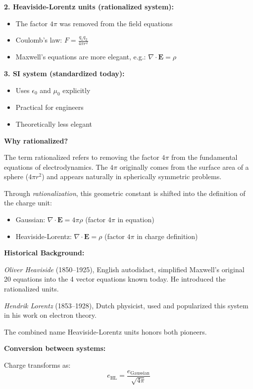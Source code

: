 \textbf{2. Heaviside-Lorentz units (rationalized system):}
\begin{itemize}[nosep]
	\item The factor $4\pi$ was removed from the field equations
	\item Coulomb's law: $F = \frac{q_1 q_2}{4\pi r^2}$
	\item Maxwell's equations are more elegant, e.g.: $\nabla \cdot \mathbf{E} = \rho$
\end{itemize}

\textbf{3. SI system (standardized today):}
\begin{itemize}[nosep]
	\item Uses $\epsilon_0$ and $\mu_0$ explicitly
	\item Practical for engineers
	\item Theoretically less elegant
\end{itemize}

\textbf{Why rationalized?}

The term rationalized refers to removing the factor $4\pi$ from the fundamental equations of electrodynamics. The $4\pi$ originally comes from the surface area of a sphere ($4\pi r^2$) and appears naturally in spherically symmetric problems.

Through \textit{rationalization}, this geometric constant is shifted into the definition of the charge unit:
\begin{itemize}[nosep]
	\item Gaussian: $\nabla \cdot \mathbf{E} = 4\pi\rho$ (factor $4\pi$ in equation)
	\item Heaviside-Lorentz: $\nabla \cdot \mathbf{E} = \rho$ (factor $4\pi$ in charge definition)
\end{itemize}

\textbf{Historical Background:}

\textit{Oliver Heaviside} (1850--1925), English autodidact, simplified Maxwell's original 20 equations into the 4 vector equations known today. He introduced the rationalized units.

\textit{Hendrik Lorentz} (1853--1928), Dutch physicist, used and popularized this system in his work on electron theory.

The combined name Heaviside-Lorentz units honors both pioneers.

\textbf{Conversion between systems:}

Charge transforms as:
\begin{equation}
	e_{\text{HL}} = \frac{e_{\text{Gaussian}}}{\sqrt{4\pi}}
\end{equation}

